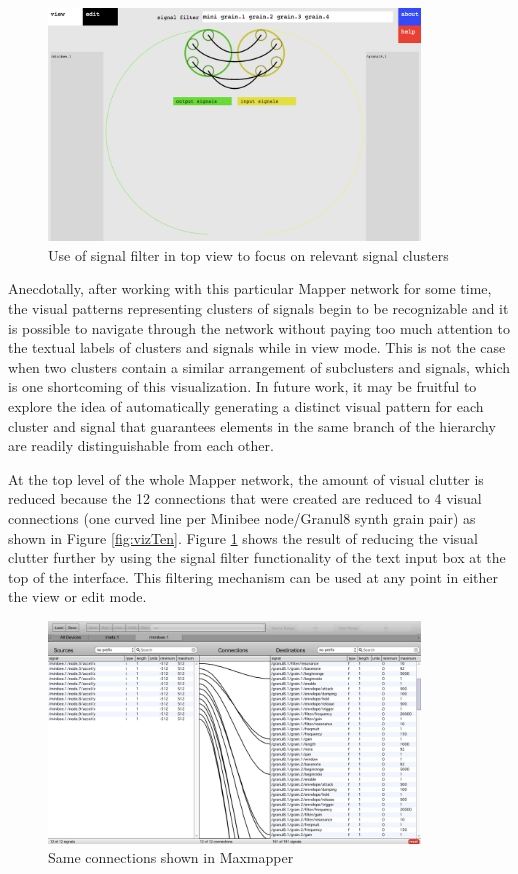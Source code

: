 \begin{figure}[hp]
\centering
\includegraphics[width=0.88\textwidth]{vizmapperEleven.png}
\caption{Use of signal filter in top view to focus on relevant signal clusters}
\label{fig:vizEleven}
\end{figure}

Anecdotally, after working with this particular Mapper network for some time, the visual patterns representing clusters of signals begin to be recognizable and it is possible to navigate through the network without paying too much attention to the textual labels of clusters and signals while in view mode. This is not the case when two clusters contain a similar arrangement of subclusters and signals, which is one shortcoming of this visualization. In future work, it may be fruitful to explore the idea of automatically generating a distinct visual pattern for each cluster and signal that guarantees elements in the same branch of the hierarchy are readily distinguishable from each other.

At the top level of the whole Mapper network, the amount of visual clutter is reduced because the 12 connections that were created are reduced to 4 visual connections (one curved line per Minibee node/Granul8 synth grain pair) as shown in Figure \ref{fig:vizTen}. Figure \ref{fig:vizEleven} shows the result of reducing the visual clutter further by using the signal filter functionality of the text input box at the top of the interface. This filtering mechanism can be used at any point in either the view or edit mode.

\begin{figure}[hp]
\centering
\includegraphics[width=0.88\textwidth]{maxmapperSecond.png}
\caption{Same connections shown in Maxmapper}
\label{fig:maxTwo}
\end{figure}

